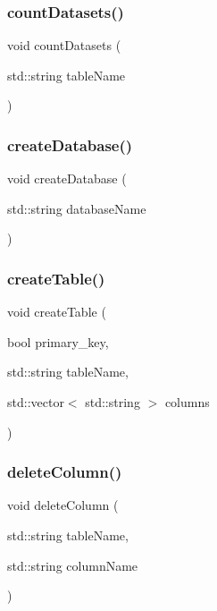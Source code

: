 \mbox{\label{sqllib_8hpp_ad2178bf4577d7eea6caebd8d1c942088}} 
\subsubsection{count\+Datasets()}
{\footnotesize\ttfamily void count\+Datasets (\begin{DoxyParamCaption}\item[{std\+::string}]{table\+Name }\end{DoxyParamCaption})}

\mbox{\label{sqllib_8hpp_abf48eb274e662a7de3f5f190d126b765}} 
\subsubsection{create\+Database()}
{\footnotesize\ttfamily void create\+Database (\begin{DoxyParamCaption}\item[{std\+::string}]{database\+Name }\end{DoxyParamCaption})}

\mbox{\label{sqllib_8hpp_a018659fc814b4a097c4b4862f42fe554}} 
\subsubsection{create\+Table()}
{\footnotesize\ttfamily void create\+Table (\begin{DoxyParamCaption}\item[{bool}]{primary\+\_\+key,  }\item[{std\+::string}]{table\+Name,  }\item[{std\+::vector$<$ std\+::string $>$}]{columns }\end{DoxyParamCaption})}

\mbox{\label{sqllib_8hpp_aa3b10ab46a5fb3caa76745e084685e76}} 
\subsubsection{delete\+Column()}
{\footnotesize\ttfamily void delete\+Column (\begin{DoxyParamCaption}\item[{std\+::string}]{table\+Name,  }\item[{std\+::string}]{column\+Name }\end{DoxyParamCaption})}

